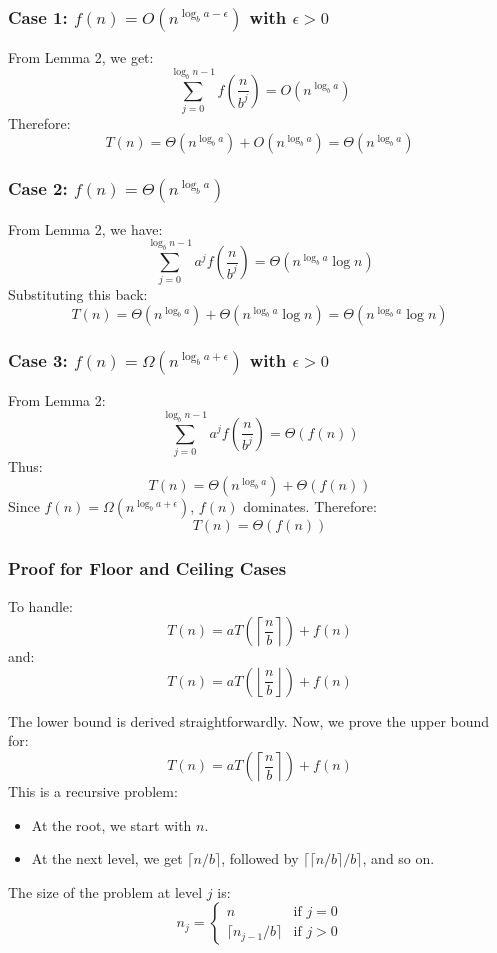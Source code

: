 \subsubsection{Case 1: \(f(n) = O(n^{\log_b a - \epsilon})\) with \(\epsilon > 0\)}
From Lemma 2, we get:
\[
\sum_{j=0}^{\log_b n - 1} f\left(\frac{n}{b^j}\right) = O(n^{\log_b a})
\]
Therefore:
\[
T(n) = \Theta(n^{\log_b a}) + O(n^{\log_b a}) = \Theta(n^{\log_b a})
\]

\subsubsection{Case 2: \(f(n) = \Theta(n^{\log_b a})\)}
From Lemma 2, we have:
\[
\sum_{j=0}^{\log_b n - 1} a^j f\left(\frac{n}{b^j}\right) = \Theta(n^{\log_b a} \log n)
\]
Substituting this back:
\[
T(n) = \Theta(n^{\log_b a}) + \Theta(n^{\log_b a} \log n) = \Theta(n^{\log_b a} \log n)
\]

\subsubsection{Case 3: \(f(n) = \Omega(n^{\log_b a + \epsilon})\) with \(\epsilon > 0\)}
From Lemma 2:
\[
\sum_{j=0}^{\log_b n - 1} a^j f\left(\frac{n}{b^j}\right) = \Theta(f(n))
\]
Thus:
\[
T(n) = \Theta(n^{\log_b a}) + \Theta(f(n))
\]
Since \(f(n) = \Omega(n^{\log_b a + \epsilon})\), \(f(n)\) dominates. Therefore:
\[
T(n) = \Theta(f(n))
\]

\subsubsection{Proof for Floor and Ceiling Cases}
To handle:
\[
T(n) = aT\left(\left\lceil \frac{n}{b} \right\rceil \right) + f(n)
\]
and:
\[
T(n) = aT\left(\left\lfloor \frac{n}{b} \right\rfloor \right) + f(n)
\]

The lower bound is derived straightforwardly. Now, we prove the upper bound for:
\[
T(n) = aT\left(\left\lceil \frac{n}{b} \right\rceil \right) + f(n)
\]
This is a recursive problem:
\begin{itemize}
    \item At the root, we start with \(n\).
    \item At the next level, we get \(\lceil n/b \rceil\), followed by \(\lceil \lceil n/b \rceil / b \rceil\), and so on.
\end{itemize}
The size of the problem at level \(j\) is:
\[
n_j = 
\begin{cases} 
n & \text{if } j = 0 \\
\lceil n_{j-1}/b \rceil & \text{if } j > 0 
\end{cases}
\]

